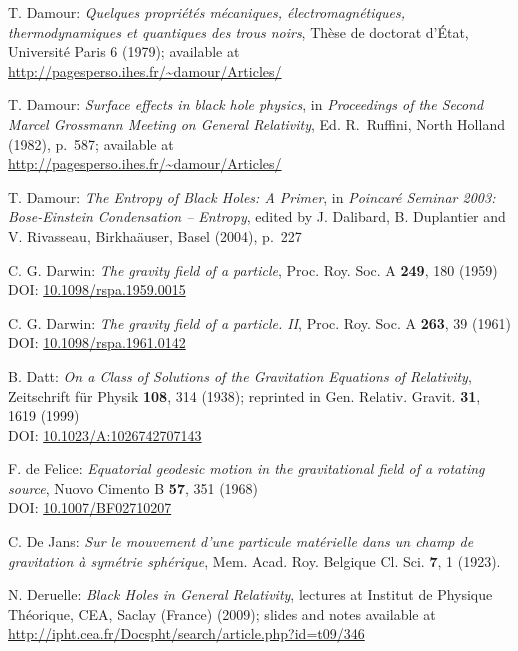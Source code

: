 \begin{thebibliography}{123}
T. Damour: {\em Quelques propri\'et\'es m\'ecaniques, \'electromagn\'etiques,
thermo\-dy\-na\-mi\-ques et quantiques des trous noirs},
Th\`ese de doctorat d'\'Etat, Universit\'e Paris 6 (1979); available at\\
\url{http://pagesperso.ihes.fr/~damour/Articles/}

T. Damour: {\em Surface effects in black hole physics},
in {\em Proceedings of the Second Marcel Grossmann Meeting on General
Relativity}, Ed. R.~Ruffini, North Holland (1982), p.~587; available at\\
\url{http://pagesperso.ihes.fr/~damour/Articles/}

T. Damour: {\em The Entropy of Black Holes: A Primer},
in {\em Poincaré Seminar 2003: Bose-Einstein Condensation -- Entropy},
edited by J. Dalibard, B. Duplantier and V. Rivasseau, Birkha\"auser, Basel (2004),
p.~227

C. G. Darwin: {\em The gravity field of a particle},
Proc. Roy. Soc. A {\bf 249}, 180 (1959)\\
DOI: \href{https://doi.org/10.1098/rspa.1959.0015}{10.1098/rspa.1959.0015}

C. G. Darwin: {\em The gravity field of a particle. II},
Proc. Roy. Soc. A {\bf 263}, 39 (1961)\\
DOI: \href{https://doi.org/10.1098/rspa.1961.0142}{10.1098/rspa.1961.0142}

B. Datt:
{\em On a Class of Solutions of the Gravitation Equations of Relativity},
Zeitschrift für Physik {\bf 108}, 314 (1938);
reprinted in Gen. Relativ. Gravit. {\bf 31}, 1619 (1999)\\
DOI: \href{https://doi.org/10.1023/10.1023/A:1026742707143}{10.1023/A:1026742707143}

F. de Felice:
{\em Equatorial geodesic motion in the gravitational field of a rotating source},
Nuovo Cimento B {\bf 57}, 351 (1968)\\
DOI: \href{https://doi.org/10.1007/BF02710207}{10.1007/BF02710207}

C. De Jans:
\emph{Sur le mouvement d'une particule matérielle dans un champ de gravitation à symétrie sphérique},
Mem. Acad. Roy. Belgique Cl. Sci. {\bf 7}, 1 (1923).

N. Deruelle: {\em Black Holes in General Relativity}, lectures at
Institut de Physique Théorique, CEA, Saclay (France) (2009); slides and notes
available at \\
\url{http://ipht.cea.fr/Docspht/search/article.php?id=t09/346}


\end{thebibliography}
